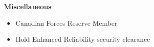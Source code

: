 \documentclass[letterpaper,11pt]{article}
\makeatletter
\newcommand{\resitem}[1]{\item #1 \vspace{-2pt}}
\newcommand{\resheading}[1]{{\large \colorbox{mygrey}{\begin{minipage}{\textwidth}{\textbf{#1 \vphantom{p\^{E}} }}\end{minipage}} }}
\newcommand{\ressubheading}[4]{
\begin{tabular*}{6.5in}{l@{\extracolsep{\fill}}r}
        \textbf{#1} & #2 \\
        \textit{#3} & \textit{#4} \\
\end{tabular*}\vspace{-6pt}}
\makeatother
\begin{document}
\begin{comment}
\resheading{Professional Development} %
    \begin{itemize}
        \item[]
            \ressubheading{Regional Cadet Instructor School (Atlantic)}{Shearwater NS}{Captain Qualification Course}{Jan. 2012 - Mar. 2012}
            \begin{itemize}
                \resitem{Four weekends of training}
                \resitem{Training Topics: military writing, communicating with the public, situational leadership, communicating effectively, leading a meeting}
            \end{itemize}
        \item[]
            \ressubheading{Regional Cadet Instructor School (Atlantic)}{Shearwater NS}{Lieutenant Qualification Course}{Oct. 2010 - 4 Dec. 2010}
            \begin{itemize}
                \resitem{Four weekends of training}
                \resitem{Training Topics: military writing, counseling, developing a training schedule}
            \end{itemize}
        \item[]
            \ressubheading{Regional Cadet Instructor School (Atlantic)}{Gagetown NB}{Military Occupation Code Course}{June 2007}
            \begin{itemize}
                \resitem{Ten days of training}
                \resitem{Training Topics: seamanship, sailing, lifting devices, nautical navigation}
            \end{itemize}
        \item[]
            \ressubheading{Regional Cadet Instructor School (Atlantic)}{Gagetown NB}{Basic Officer Qualification}{June 2007}
            \begin{itemize}
                \resitem{Ten days of training}
                \resitem{Training Topics: military writing, drill, instruction, military ranks and processes}
            \end{itemize}
    \end{itemize}
\end{comment}

\resheading{{Miscellaneous}} %
    \begin{itemize}
        \item Canadian Forces Reserve Member
        \item Hold Enhanced Reliability security clearance
    \end{itemize}
\end{document}
